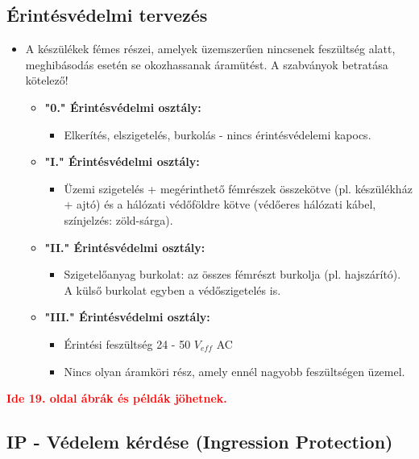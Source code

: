 \documentclass[11pt]{article}
\begin{document}
		\subsection{Érintésvédelmi tervezés}

			\begin{itemize}
				\item A készülékek fémes részei, amelyek üzemszerűen nincsenek feszültség alatt, meghibásodás esetén se okozhassanak áramütést. A szabványok betratása kötelező!
				\begin{itemize}
					\item \textbf{"0." Érintésvédelmi osztály:}
					\begin{itemize}
						\item Elkerítés, elszigetelés, burkolás - nincs érintésvédelemi kapocs.
					\end{itemize}
					\item \textbf{"I." Érintésvédelmi osztály:}
					\begin{itemize}
						\item Üzemi szigetelés + megérinthető fémrészek összekötve (pl. készülékház + ajtó) és a hálózati védőföldre kötve (védőeres hálózati kábel, színjelzés: zöld-sárga).
					\end{itemize}
					\item \textbf{"II." Érintésvédelmi osztály:}
					\begin{itemize}
						\item Szigetelőanyag burkolat: az összes fémrészt burkolja (pl. hajszárító). A külső burkolat egyben a védőszigetelés is.
					\end{itemize}
					\item \textbf{"III." Érintésvédelmi osztály:}
					\begin{itemize}
						\item Érintési feszültség 24 - 50 $V_{eff}$ AC
						\item Nincs olyan áramköri rész, amely ennél nagyobb feszültségen üzemel.
					\end{itemize}
				\end{itemize}
			\end{itemize}

			\textbf{\textcolor{red}{Ide 19. oldal ábrák és példák jöhetnek.}}

		\subsection{IP - Védelem kérdése (Ingression Protection)}
\end{document}
